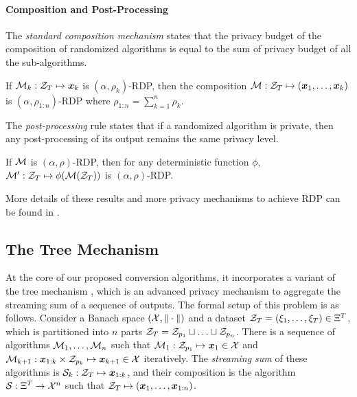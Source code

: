 \paragraph{Composition and Post-Processing}
The \emph{standard composition mechanism} states that the privacy budget of the composition of randomized algorithms is equal to the sum of privacy budget of all the sub-algorithms.

\begin{theorem}[Composition]
If ${\cal M}_k:{\cal Z}_T\mapsto {\boldsymbol{x}}_k$ is $(\alpha, \rho_k)$-RDP, then the composition ${\cal M}:{\cal Z}_T \mapsto ({\boldsymbol{x}}_1,\ldots,{\boldsymbol{x}}_k)$ is $(\alpha, \rho_{1:n})$-RDP where $\rho_{1:n}=\sum_{k=1}^n \rho_k$.
\label{thm:DP-OTB:composition}
\end{theorem}

The \emph{post-processing} rule states that if a randomized algorithm is private, then any post-processing of its output remains the same privacy level.

\begin{theorem}
If ${\cal M}$ is $(\alpha,\rho)$-RDP, then for any deterministic function $\phi$, ${\cal M}': {\cal Z}_T \mapsto \phi({\cal M}({\cal Z}_T))$ is $(\alpha,\rho)$-RDP.
\label{thm:DP-OTB:post-processing}
\end{theorem}

More details of these results and more privacy mechanisms to achieve RDP can be found in \citep{mironov2017renyi}.


\subsection{The Tree Mechanism}
\label{sec:DP-OTB:tree-mechanism}



At the core of our proposed conversion algorithms, it incorporates a variant of the tree mechanism \citep{dwork2010differential, chan2011private}, which is an advanced privacy mechanism to aggregate the streaming sum of a sequence of outputs. The formal setup of this problem is as follows. Consider a Banach space $({\cal X},\|\cdot\|)$ and a dataset ${\cal Z}_T=(\xi_1,\ldots,\xi_T)\in\Xi^T$, which is partitioned into $n$ parts ${\cal Z}_T = {\cal Z}_{p_1} \sqcup \ldots \sqcup {\cal Z}_{p_n}$. There is a sequence of algorithms ${\cal M}_1,\ldots,{\cal M}_n$ such that ${\cal M}_1:{\cal Z}_{p_1}\mapsto {\boldsymbol{x}}_1\in{\cal X}$ and ${\cal M}_{k+1}:{\boldsymbol{x}}_{1:k}\times {\cal Z}_{p_k} \mapsto {\boldsymbol{x}}_{k+1}\in{\cal X}$ iteratively. The \emph{streaming sum} of these algorithms is ${\cal S}_k: {\cal Z}_T \mapsto {\boldsymbol{x}}_{1:k}$, and their composition is the algorithm ${\cal S}: \Xi^T\to {\cal X}^n$ such that ${\cal Z}_T\mapsto ({\boldsymbol{x}}_1,\ldots,{\boldsymbol{x}}_{1:n})$.

